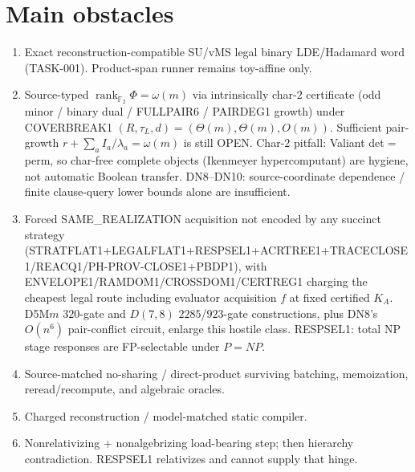 \documentclass[11pt]{article}
\begin{document}
\section*{Main obstacles}
\begin{enumerate}
\item Exact reconstruction-compatible SU/vMS legal binary LDE/Hadamard word
(TASK-001). Product-span runner remains toy-affine only.
\item Source-typed $\operatorname{rank}_{\mathbb F_2}\Phi=\omega(m)$ via
intrinsically char-$2$ certificate (odd minor / binary dual / FULLPAIR6 /
PAIRDEG1 growth) under COVERBREAK1
$(R,\tau_L,d)=(\Theta(m),\Theta(m),O(m))$. Sufficient pair-growth
$r+\sum_a I_a/\lambda_a=\omega(m)$ is still OPEN. Char-$2$ pitfall: Valiant
det$=$perm, so char-free complete objects (Ikenmeyer hypercomputant) are
hygiene, not automatic Boolean transfer. DN8--DN10: source-coordinate
dependence / finite clause-query lower bounds alone are insufficient.
\item Forced SAME\_REALIZATION acquisition not encoded by any succinct strategy
(STRATFLAT1+LEGALFLAT1+RESPSEL1+ACRTREE1+TRACECLOSE1/REACQ1/PH-PROV-CLOSE1+PBDP1),
with ENVELOPE1/RAMDOM1/CROSSDOM1/CERTREG1 charging the cheapest legal route
including evaluator acquisition $f$ at fixed certified $K_A$. D5M$m$ $320$-gate
and $D(7,8)$ $2285$/$923$-gate constructions, plus DN8's $O(n^6)$ pair-conflict
circuit, enlarge this hostile class. RESPSEL1: total NP stage responses are
FP-selectable under $P=NP$.
\item Source-matched no-sharing / direct-product surviving batching, memoization,
reread/recompute, and algebraic oracles.
\item Charged reconstruction / model-matched static compiler.
\item Nonrelativizing + nonalgebrizing load-bearing step; then hierarchy
contradiction. RESPSEL1 relativizes and cannot supply that hinge.
\end{enumerate}
\end{document}
